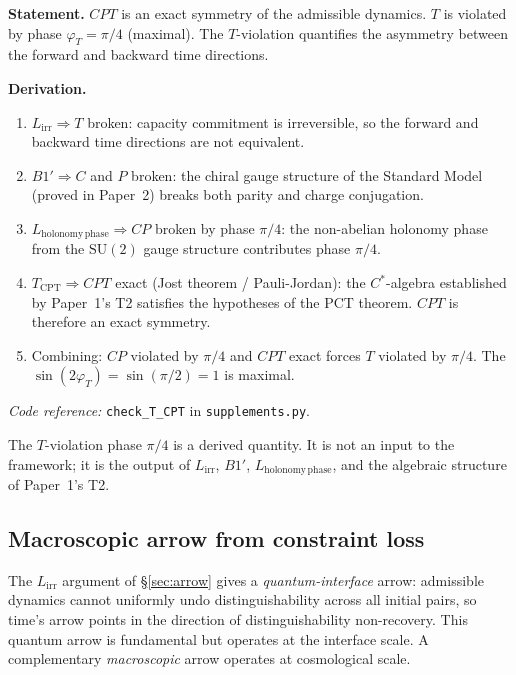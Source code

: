 \documentclass[11pt]{article}
\newcommand{\coderef}[2]{\smallskip\noindent\textit{Code reference:} \texttt{#1} in \texttt{#2}.}
\newcommand{\SU}{\mathrm{SU}}
\newcommand{\epitag}[1]{\textbf{[#1]}}
\begin{document}
\begin{tcolorbox}[apfbox, title={Theorem $T_{\mathrm{CPT}}$ ($CPT$ Invariance and $T$-Violation) \epitag{P}}]
\textbf{Statement.}  $CPT$ is an exact symmetry of the admissible dynamics.
$T$ is violated by phase $\varphi_T = \pi/4$ (maximal).  The $T$-violation
quantifies the asymmetry between the forward and backward time directions.

\textbf{Derivation.}
\begin{enumerate}[nosep]
\item $L_{\mathrm{irr}} \Rightarrow T$ broken: capacity commitment is
  irreversible, so the forward and backward time directions are not equivalent.

\item $B1' \Rightarrow C$ and $P$ broken: the chiral gauge structure of the
  Standard Model (proved in Paper~2) breaks both parity and charge conjugation.

\item $L_{\mathrm{holonomy\,phase}} \Rightarrow CP$ broken by phase $\pi/4$:
  the non-abelian holonomy phase from the $\SU(2)$ gauge structure contributes
  phase $\pi/4$.

\item $T_{\mathrm{CPT}} \Rightarrow CPT$ exact (Jost theorem / Pauli-Jordan):
  the $C^*$-algebra established by Paper~1's T2 satisfies the hypotheses of
  the PCT theorem.  $CPT$ is therefore an exact symmetry.

\item Combining: $CP$ violated by $\pi/4$ and $CPT$ exact forces
  $T$ violated by $\pi/4$.  The $\sin(2\varphi_T) = \sin(\pi/2) = 1$
  is maximal.
\end{enumerate}

\coderef{check\_T\_CPT}{supplements.py}
\end{tcolorbox}

The $T$-violation phase $\pi/4$ is a derived quantity.  It is not an input
to the framework; it is the output of $L_{\mathrm{irr}}$, $B1'$,
$L_{\mathrm{holonomy\,phase}}$, and the algebraic structure of Paper~1's T2.

\subsection{Macroscopic arrow from constraint loss}
\label{subsec:arrow_macroscopic}

The $L_{\mathrm{irr}}$ argument of \S\ref{sec:arrow} gives a
\emph{quantum-interface} arrow: admissible dynamics cannot uniformly undo
distinguishability across all initial pairs, so time's arrow points in the
direction of distinguishability non-recovery.  This quantum arrow is
fundamental but operates at the interface scale.  A complementary
\emph{macroscopic} arrow operates at cosmological scale.
\end{document}
